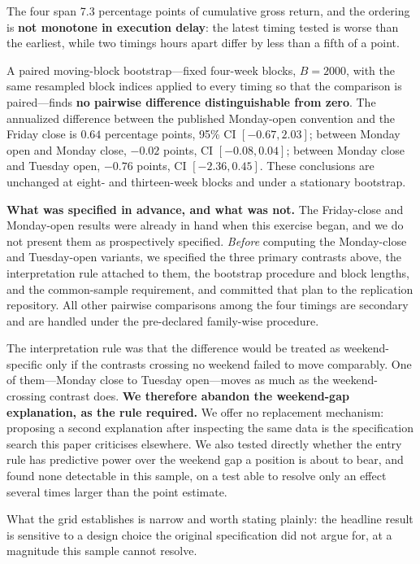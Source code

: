 \documentclass[11pt]{article}
\begin{document}
The four span 7.3 percentage points of cumulative gross return, and the ordering is \textbf{not monotone in execution delay}: the latest timing tested is worse than the earliest, while two timings hours apart differ by less than a fifth of a point.

A paired moving-block bootstrap---fixed four-week blocks, $B = 2000$, with the same resampled block indices applied to every timing so that the comparison is paired---finds \textbf{no pairwise difference distinguishable from zero}. The annualized difference between the published Monday-open convention and the Friday close is $0.64$ percentage points, 95\% CI $[-0.67, 2.03]$; between Monday open and Monday close, $-0.02$ points, CI $[-0.08, 0.04]$; between Monday close and Tuesday open, $-0.76$ points, CI $[-2.36, 0.45]$. These conclusions are unchanged at eight- and thirteen-week blocks and under a stationary bootstrap.

\textbf{What was specified in advance, and what was not.} The Friday-close and Monday-open results were already in hand when this exercise began, and we do not present them as prospectively specified. \emph{Before} computing the Monday-close and Tuesday-open variants, we specified the three primary contrasts above, the interpretation rule attached to them, the bootstrap procedure and block lengths, and the common-sample requirement, and committed that plan to the replication repository. All other pairwise comparisons among the four timings are secondary and are handled under the pre-declared family-wise procedure.

The interpretation rule was that the difference would be treated as weekend-specific only if the contrasts crossing no weekend failed to move comparably. One of them---Monday close to Tuesday open---moves as much as the weekend-crossing contrast does. \textbf{We therefore abandon the weekend-gap explanation, as the rule required.} We offer no replacement mechanism: proposing a second explanation after inspecting the same data is the specification search this paper criticises elsewhere. We also tested directly whether the entry rule has predictive power over the weekend gap a position is about to bear, and found none detectable in this sample, on a test able to resolve only an effect several times larger than the point estimate.

What the grid establishes is narrow and worth stating plainly: the headline result is sensitive to a design choice the original specification did not argue for, at a magnitude this sample cannot resolve.
\end{document}
